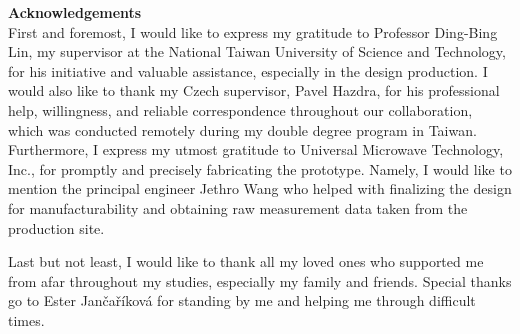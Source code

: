 \clearpage
\vspace*{\fill}
\noindent\textbf{Acknowledgements}\\[0.25cm]
First and foremost, I would like to express my gratitude to Professor Ding-Bing Lin, my supervisor at the National Taiwan University of Science and Technology, for his initiative and valuable assistance, especially in the design production. I would also like to thank my Czech supervisor, \foreignlanguage{czech}{Pavel Hazdra}, for his professional help, willingness, and reliable correspondence throughout our collaboration, which was conducted remotely during my double degree program in Taiwan. Furthermore, I express my utmost gratitude to Universal Microwave Technology, Inc., for promptly and precisely fabricating the prototype. Namely, I would like to mention the principal engineer Jethro Wang who helped with finalizing the design for manufacturability and obtaining raw measurement data taken from the production site.

Last but not least, I would like to thank all my loved ones who supported me from afar throughout my studies, especially my family and friends. Special thanks go to \foreignlanguage{czech}{Ester Jančaříková} for standing by me and helping me through difficult times.
\clearpage